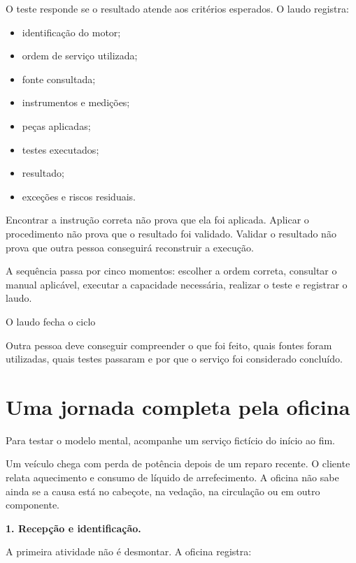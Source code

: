 \documentclass[
  10pt,
  a4paper,
  oneside]{book}
\providecommand{\tightlist}{%
  \setlength{\itemsep}{0pt}\setlength{\parskip}{0pt}}
\begin{document}
O teste responde se o resultado atende aos critérios esperados. O laudo
registra:

\begin{itemize}
\tightlist
\item
  identificação do motor;
\item
  ordem de serviço utilizada;
\item
  fonte consultada;
\item
  instrumentos e medições;
\item
  peças aplicadas;
\item
  testes executados;
\item
  resultado;
\item
  exceções e riscos residuais.
\end{itemize}

Encontrar a instrução correta não prova que ela foi aplicada. Aplicar o
procedimento não prova que o resultado foi validado. Validar o resultado
não prova que outra pessoa conseguirá reconstruir a execução.

A sequência passa por cinco momentos: escolher a ordem correta,
consultar o manual aplicável, executar a capacidade necessária, realizar
o teste e registrar o laudo.

\begin{evidencebox}{O laudo fecha o ciclo}

Outra pessoa deve conseguir compreender o que foi feito, quais fontes
foram utilizadas, quais testes passaram e por que o serviço foi
considerado concluído.

\end{evidencebox}

\hypertarget{uma-jornada-completa-pela-oficina}{%
\section{Uma jornada completa pela
oficina}\label{uma-jornada-completa-pela-oficina}}

Para testar o modelo mental, acompanhe um serviço fictício do início ao
fim.

Um veículo chega com perda de potência depois de um reparo recente. O
cliente relata aquecimento e consumo de líquido de arrefecimento. A
oficina não sabe ainda se a causa está no cabeçote, na vedação, na
circulação ou em outro componente.

\textbf{1. Recepção e identificação.}

A primeira atividade não é desmontar. A oficina registra:
\end{document}
